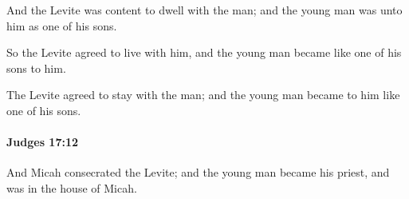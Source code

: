 			\begin{versebox}
					\item[BHS] 
					\item[ASV] And the Levite was content to dwell with the man; and the young man was unto him as one of his sons.
					\item[NIV] So the Levite agreed to live with him, and the young man became like one of his sons to him.
					\item[NRSV] The Levite agreed to stay with the man; and the young man became to him like one of his sons.
			\end{versebox}

		\paragraph{Judges 17:12} %
			\label{JUDGES-17-12}

			And Micah consecrated the Levite; and the young man became his priest, and was in the house of Micah.

